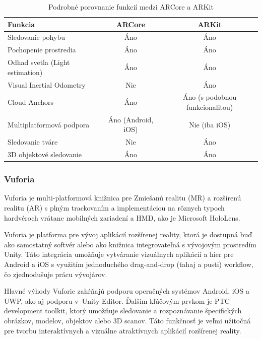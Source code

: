 \begin{table}[h]
\centering
\caption{Podrobné porovnanie funkcií medzi ARCore a ARKit}
\label{tab:arcore-arkit-comparison}
\begin{tabular}{|l|c|c|}
\hline
\textbf{Funkcia} & \textbf{ARCore} & \textbf{ARKit} \\ \hline
Sledovanie pohybu & Áno & Áno \\ \hline
Pochopenie prostredia & Áno & Áno \\ \hline
Odhad svetla (Light estimation) & Áno & Áno \\ \hline
Visual Inertial Odometry & Nie & Áno \\ \hline
Cloud Anchors & Áno & Áno (s podobnou funkcionalitou) \\ \hline
Multiplatformová podpora & Áno (Android, iOS) & Nie (iba iOS) \\ \hline
Sledovanie tváre & Nie & Áno \\ \hline
3D objektové sledovanie & Áno & Áno \\ \hline
\end{tabular}
\end{table}

\subsubsection{Vuforia}

Vuforia je multi-platformová knižnica pre Zmiešanú realitu (MR) a rozšírenú realitu (AR) s plným trackovaním a implementáciou na rôznych typoch hardvéroch vrátane mobilných zariadení a HMD, ako je Microsoft HoloLens. %

Vuforia je platforma pre vývoj aplikácií rozšírenej reality, ktorá je dostupná buď ako samostatný softvér alebo ako knižnica integrovateľná s vývojovým prostredím Unity. Táto integrácia umožňuje vytváranie vizuálnych aplikácií a hier pre Android a iOS s využitím jednoduchého drag-and-drop (ťahaj a pusti) workflow, čo zjednodušuje prácu vývojárov. %

Hlavné výhody Vuforie zahŕňajú podporu operačných systémov Android, iOS a UWP, ako aj podporu v~Unity Editor. Ďalším kľúčovým prvkom je PTC development toolkit, ktorý umožňuje sledovanie a rozpoznávanie špecifických obrázkov, modelov, objektov alebo 3D scanov. Táto funkčnosť je veľmi užitočná pre tvorbu interaktívnych a vizuálne atraktívnych aplikácií rozšírenej reality. %


